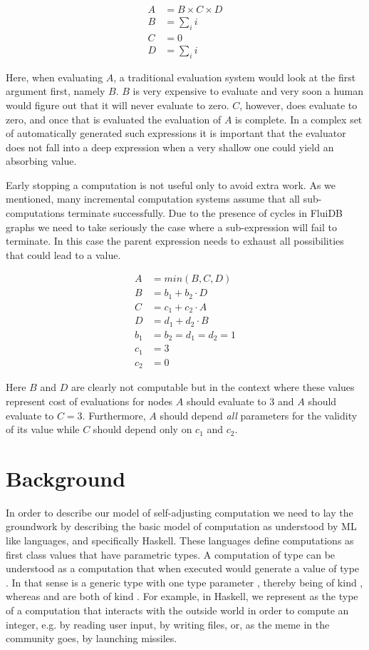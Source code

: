 \begin{align*}
A &= B \times C \times D \\
B &= \sum_i{i} \\
C &= 0 \\
D &= \sum_i{i}
\end{align*}

Here, when evaluating \(A\), a traditional evaluation system would
look at the first argument first, namely \(B\). \(B\) is very
expensive to evaluate and very soon a human would figure out that it
will never evaluate to zero. \(C\), however, does evaluate to zero,
and once that is evaluated the evaluation of \(A\) is complete. In a
complex set of automatically generated such expressions it is
important that the evaluator does not fall into a deep expression when
a very shallow one could yield an absorbing value.

Early stopping a computation is not useful only to avoid extra
work. As we mentioned, many incremental computation systems assume
that all sub-computations terminate successfully. Due to the presence
of cycles in FluiDB graphs we need to take seriously the case where a
sub-expression will fail to terminate. In this case the parent
expression needs to exhaust all possibilities that could lead to a
value.

\begin{align*}
A &= min(B, C, D) \\
B &= b_1 + b_2 \cdot D \\
C &= c_1 + c_2 \cdot A \\
D &= d_1 + d_2 \cdot B \\
b_1 &= b_2 = d_1 = d_2 = 1 \\
c_1 &= 3 \\
c_2 &= 0
\end{align*}

Here \(B\) and \(D\) are clearly not computable but in the context
where these values represent cost of evaluations for nodes \(A\)
should evaluate to 3 and \(A\) should evaluate to \(C =
3\). Furthermore, \(A\) should depend \emph{all} parameters for the
validity of its value while \(C\) should depend only on \(c_1\) and
\(c_2\).


\section{Background}

In order to describe our model of self-adjusting computation we need
to lay the groundwork by describing the basic model of computation as
understood by ML like languages, and specifically Haskell. These
languages define computations as first class values that have
parametric types. A computation of type  can be understood
as a computation that when executed would generate a value of type
. In that sense  is a generic type with one type
parameter , thereby being of kind \hask{* -> *}, whereas
 and  are both of kind \hask{*}. For example,
in Haskell, we represent as  the type of a computation
that interacts with the outside world in order to compute an integer,
e.g. by reading user input, by writing files, or, as the meme in the
community goes, by launching missiles.

